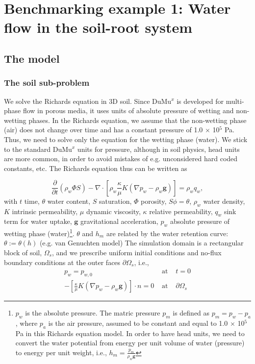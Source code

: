 \chapter*{Benchmarking example 1: Water flow in the soil-root system}

\section*{The model}
\subsection*{The soil sub-problem}
We solve the Richards equation in 3D soil. Since DuMu$^x$ is developed for multi-phase flow in porous media, it uses units of absolute pressure of wetting and non-wetting phases. In the Richards equation, we assume that the non-wetting phase (air) does not change over time and has a constant pressure of 1.0 $\times$ 10$^5$ Pa. Thus, we need to solve only the equation for the wetting phase (water). We stick to the standard DuMu$^x$ units for pressure, although in soil physics, head units are more common, in order to avoid mistakes of e.g. unconsidered hard coded constants, etc. The Richards equation thus can be written as 

\begin{equation}
\frac{\partial}{\partial t} \left(\rho_w \Phi S \right) - \nabla  \cdot \left[\rho_w \frac{\kappa}{\mu}K \left(\nabla p_w-\rho_w \mathbf{g} \right) \right] = \rho_w q_w,
\end{equation}
with $t$ time, $\theta$ water content, $S$ saturation, $\Phi$ porosity, $S \phi = \theta$, $\rho_w$ water density, $K$ intrinsic permeability, $\mu$ dynamic viscosity, $\kappa$ relative permeability, $q_w$ sink term for water uptake, $\mathbf{g}$ gravitational acceleration, $p_w$ absolute pressure of wetting phase (water)\footnote{$p_w$ is the absolute pressure. The matric pressure $p_m$ is defined as $p_m = p_w-p_a$, where $p_a$ is the air pressure, assumed to be constant and equal to 1.0 $\times$ 10$^5$ Pa in this Richards equation model. In order to have head units, we need to convert the water potential from energy per unit volume of water (pressure) to energy per unit weight, i.e., $h_m=\frac{p_m}{\rho_w \mathbf{g}}$}. $\theta$ and $h_m$ are related by the water retention curve: $\theta:= \theta(h)$ (e.g. van Genuchten model)
The simulation domain is a rectangular block of soil, $\Omega_s$, and we prescribe uniform initial conditions and no-flux boundary conditions at the outer faces $\partial \Omega_s$, i.e.,
\begin{eqnarray}
p_w = p_{w,0} & \text{ at } & t=0\\
-\left[\frac{\kappa}{\mu}K \left(\nabla p_w-\rho_w \mathbf{g} \right) \right]\cdot n = 0 & \text{ at } & \partial \Omega_s
\end{eqnarray}

